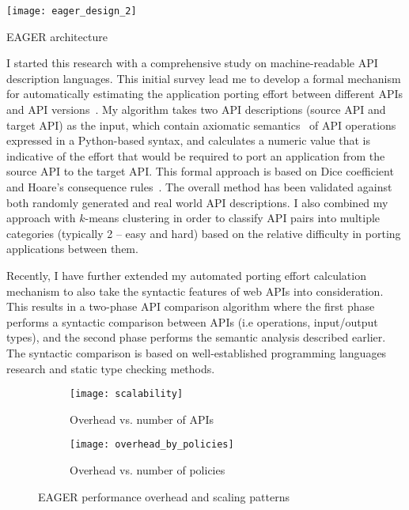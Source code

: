 \begin{floatingfigure}[rb]{2.8in}
\vspace{-0.1in}
\texttt{[image: eager\_design\_2]}
\vspace{-0.08in}
\caption{EAGER architecture\label{fig:eager}}
\end{floatingfigure}

I started this research with a comprehensive study on machine-readable 
API description languages. This initial survey lead me to develop a formal 
mechanism for automatically estimating the application porting effort between 
different APIs and API versions~\cite{6930607}. My algorithm takes two API descriptions 
(source API and target API) as the input, which contain axiomatic semantics~\cite{Hoare:1969:ABC:363235.363259} of 
API operations expressed in a Python-based syntax, and calculates a numeric 
value that is indicative of the effort that would be required to port an application 
from the source API to the target API. This formal approach is based on Dice 
coefficient~\cite{dice1945,738528} 
and Hoare's consequence rules~\cite{Hoare:1969:ABC:363235.363259}. The overall method has been 
validated against both randomly generated and real world API descriptions. 
I also combined my approach with $k$-means clustering in order to classify API pairs into 
multiple categories (typically 2 -- easy and hard) based on the relative difficulty in 
porting applications between them. %

Recently, I have further extended my automated porting effort calculation 
mechanism to also take the syntactic features of web APIs into consideration. This 
results in a two-phase API comparison algorithm where the first phase performs a 
syntactic comparison between APIs (i.e operations, input/output types), and the 
second phase performs the semantic analysis described earlier. The syntactic 
comparison is based on well-established programming languages research and 
static type checking methods.

\begin{figure}
\centering
\begin{subfigure}{.5\textwidth}
  \centering
  \texttt{[image: scalability]}
  \caption{Overhead vs. number of APIs}
  \label{fig:sub1}
\end{subfigure}%
\begin{subfigure}{.5\textwidth}
  \centering
  \texttt{[image: overhead\_by\_policies]}
  \caption{Overhead vs. number of policies}
  \label{fig:sub2}
\end{subfigure}
\caption{EAGER performance overhead and scaling patterns}
\label{fig:eager_perf}
\end{figure}

